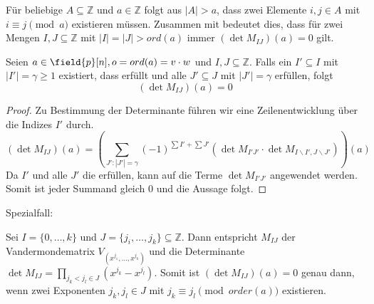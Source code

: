 Für beliebige $A \subseteq \mathbb{Z}$ und $a \in \mathbb{Z}$ folgt aus $|A| > a$, dass zwei Elemente $i,j \in A$ mit $i \equiv j \pmod a$ existieren müssen. Zusammen mit  bedeutet dies, dass für zwei Mengen $I,J \subseteq \mathbb{Z}$ mit $|I|=|J| > ord(a)$ immer $(\det M_{IJ})(a) = 0$ gilt. 

{
\begin{satz}
    Seien $a \in \field{p}[n], o = ord(a) = v\cdot w$ und $I,J \subseteq \mathbb{Z}$.
    Falls ein $I' \subseteq I$ mit $|I'| = \gamma \geq 1$ existiert, dass  erfüllt und alle $J' \subseteq J$ mit $|J'| = \gamma$  erfüllen, folgt
    \begin{equation*}
        (\det M_{IJ})(a) = 0
    \end{equation*}
\end{satz}

\begin{proof}
    Zu Bestimmung der Determinante führen wir eine Zeilenentwicklung über die Indizes $I'$ durch. 
\begin{equation*}
    (\det M_{IJ})(a) = \left( \sum_{J':|J'| = \gamma} (-1)^{\sum I' + \sum J'} \left( \det M_{I'J'} \cdot \det M_{I\backslash I',J\backslash J'} \right) \right)(a)
\end{equation*}
Da $I'$ und alle $J'$ die  erfüllen, kann  auf die Terme $\det M_{I'J'}$ angewendet werden. Somit ist jeder Summand gleich $0$ und die Aussage folgt.
\end{proof}
}

Spezialfall:

Sei $I=\{0,\dots,k\}$ und $J=\{j_i,\dots,j_k\} \subseteq \mathbb{Z}$. Dann entspricht $M_{IJ}$ der Vandermondematrix $V_{(x^{j_1},\dots,x^{j_k})}$ und die Determinante $\det M_{IJ} = \prod_{j_k<j_l \in J} (x^{j_k} - x^{j_l})$. Somit ist $(\det M_{IJ})(a) = 0$ genau dann, wenn zwei Exponenten $j_k,j_l \in J$ mit $j_k \equiv j_l \pmod{order(a)}$ existieren.
